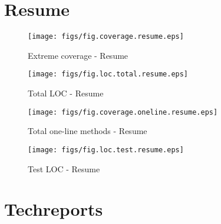 \clearpage


\section {Resume}

\begin{figure}[htbp]
  \begin{minipage}[htbp]{.45\linewidth}
    \begin{center}
      \texttt{[image: figs/fig.coverage.resume.eps]}
      \caption{Extreme coverage - Resume}
      \label{fig:coverage.resume}
    \end{center}
  \end{minipage}
\hfill
  \begin{minipage}[htbp]{.45\linewidth}
    \begin{center}
      \texttt{[image: figs/fig.loc.total.resume.eps]}
      \caption{Total LOC - Resume}
      \label{fig:loc.total.resume}
    \end{center}
  \end{minipage}
\end{figure}

\begin{figure}[htbp]
  \begin{minipage}[htbp]{.45\linewidth}
    \begin{center}
      \texttt{[image: figs/fig.coverage.oneline.resume.eps]}
      \caption{Total one-line methods - Resume}
      \label{fig:coverage.oneline.test.resume}
    \end{center}
  \end{minipage}
\hfill
  \begin{minipage}[htbp]{.45\linewidth}
    \begin{center}
      \texttt{[image: figs/fig.loc.test.resume.eps]}
      \caption{Test LOC - Resume}
      \label{fig:loc.test.resume}
    \end{center}
  \end{minipage}
\end{figure}

\clearpage


\section {Techreports}

